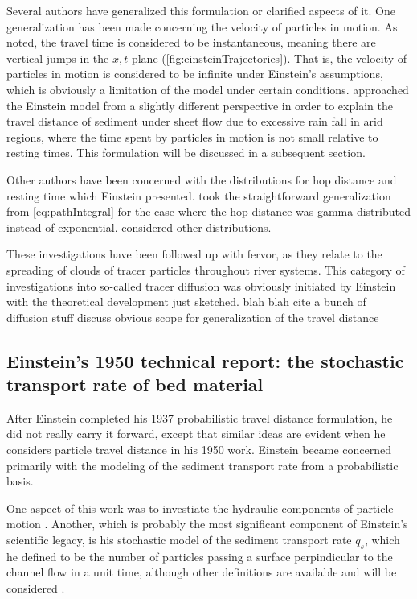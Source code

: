 Several authors have generalized this formulation or clarified aspects of it. One generalization has been made concerning the velocity of particles in motion. 
As noted, the travel time is considered to be instantaneous, meaning there are vertical jumps in the $x,t$ plane (\ref{fig:einsteinTrajectories}).
That is, the velocity of particles in motion is considered to be infinite under Einstein's assumptions, which is obviously a limitation of the model under certain conditions.  
\citet{Lisle1998} approached the Einstein model from a slightly different perspective in order to explain the travel distance of sediment under sheet flow due to excessive rain fall in arid regions, where the time spent by particles in motion is not small relative to resting times. 
This formulation will be discussed in a subsequent section.

Other authors have been concerned with the distributions for hop distance and resting time which Einstein presented. \citet{Hubbell1964} took the straightforward generalization from \ref{eq:pathIntegral} for the case where the hop distance was gamma distributed instead of exponential. \citet{Ganti2010} considered other distributions. 

These investigations have been followed up with fervor, as they relate to the spreading of clouds of tracer particles throughout river systems.
This category of investigations into so-called tracer diffusion was obviously initiated by Einstein with the theoretical development just sketched. 
blah blah cite a bunch of diffusion stuff
discuss obvious scope for generalization of the travel distance


\subsection*{Einstein's 1950 technical report: the stochastic transport rate of bed material}

After Einstein completed his 1937 probabilistic travel distance formulation, he did not really carry it forward, except that similar ideas are evident when he considers particle travel distance in his 1950 work.
Einstein became concerned primarily with the modeling of the sediment transport rate from a probabilistic basis. 

One aspect of this work was to investiate the hydraulic components of particle motion \citep{Einstein1949}. Another, which is probably the most significant component of Einstein's scientific legacy, is his stochastic model of the sediment transport rate $q_s$, which he defined to be the number of particles passing a surface perpindicular to the channel flow in a unit time, although other definitions are available and will be considered \citep{Ballio2014}. 


